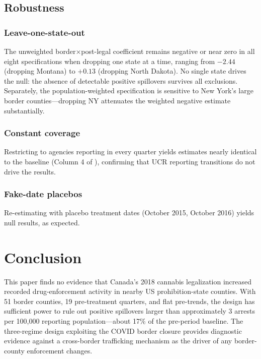 \documentclass[12pt]{article}
\begin{document}
\subsection{Robustness}



\subsubsection*{Leave-one-state-out} The unweighted border$\times$post-legal coefficient remains negative or near zero in all eight specifications when dropping one state at a time, ranging from $-2.44$ (dropping Montana) to $+0.13$ (dropping North Dakota). No single state drives the null: the absence of detectable positive spillovers survives all exclusions. Separately, the population-weighted specification is sensitive to New York's large border counties---dropping NY attenuates the weighted negative estimate substantially.

\subsubsection*{Constant coverage} Restricting to agencies reporting in every quarter yields estimates nearly identical to the baseline (Column 4 of ), confirming that UCR reporting transitions do not drive the results.

\subsubsection*{Fake-date placebos} Re-estimating with placebo treatment dates (October 2015, October 2016) yields null results, as expected.


\section{Conclusion}
\label{sec:conclusion}

This paper finds no evidence that Canada's 2018 cannabis legalization increased recorded drug-enforcement activity in nearby US prohibition-state counties. With 51 border counties, 19 pre-treatment quarters, and flat pre-trends, the design has sufficient power to rule out positive spillovers larger than approximately 3 arrests per 100,000 reporting population---about 17\% of the pre-period baseline. The three-regime design exploiting the COVID border closure provides diagnostic evidence against a cross-border trafficking mechanism as the driver of any border-county enforcement changes.
\end{document}
